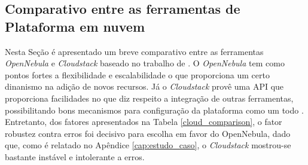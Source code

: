 \subsection{Comparativo entre as ferramentas de Plataforma em nuvem}

Nesta Seção é apresentado um breve comparativo entre as ferramentas \textit{OpenNebula} e \textit{Cloudstack} baseado no trabalho de . O \textit{OpenNebula} tem como pontos fortes a flexibilidade e escalabilidade o que proporciona um certo dinanismo na adição de novos recursos. Já o \textit{Cloudstack} provê uma API que proporciona facilidades no que diz respeito a integração de outras ferramentas, possibilitando bons mecanismos para configuração da plataforma como um todo \cite{salam}. Entretanto, dos fatores apresentados na Tabela \ref{cloud_comparison}, o fator robustez contra erros foi decisivo para escolha em favor do OpenNebula, dado que, como é relatado no Apêndice \ref{cap:estudo_caso}, o \textit{Cloudstack} mostrou-se bastante instável e intolerante a erros.

